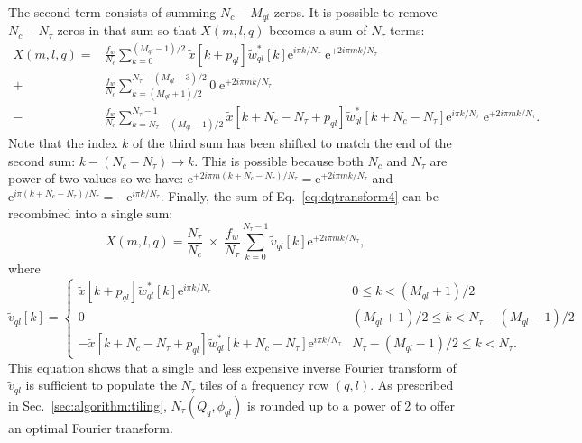 The second term consists of summing $N_c-M_{ql}$ zeros. It is possible to remove $N_c-N_\tau$ zeros in that sum so that $X(m,l,q)$ becomes a sum of $N_\tau$ terms:
\begin{align}
  X(m, l, q)
  = & \frac{f_w}{N_c} \sum_{k=0}^{(M_{ql}-1)/2}{\tilde{x}[k+p_{ql}]\tilde{w}_{ql}^*[k]\mathrm{e}^{i\pi k/N_\tau} \; \mathrm{e}^{+2i\pi mk/N_\tau}} \\
  + & \frac{f_w}{N_c} \sum_{k=(M_{ql}+1)/2}^{N_\tau-(M_{ql}-3)/2}{0 \; \mathrm{e}^{+2i\pi mk/N_\tau}} \\
  - & \frac{f_w}{N_c} \sum_{k=N_\tau-(M_{ql}-1)/2}^{N_\tau-1}{\tilde{x}[k+N_c-N_\tau+p_{ql}]\tilde{w}_{ql}^*[k+N_c-N_\tau]\mathrm{e}^{i\pi k/N_\tau} \; \mathrm{e}^{+2i\pi mk/N_\tau}} .
  \label{eq:dqtransform4}
\end{align}
Note that the index $k$ of the third sum has been shifted to match the end of the second sum: $k-(N_c-N_\tau) \rightarrow k$. This is possible because both $N_c$ and $N_\tau$ are power-of-two values so we have: $\mathrm{e}^{+2i\pi m(k+N_c-N_\tau)/N_\tau} = \mathrm{e}^{+2i\pi mk/N_\tau}$ and $\mathrm{e}^{i\pi (k+N_c-N_\tau)/N_\tau}=-\mathrm{e}^{i\pi k/N_\tau}$. Finally, the sum of Eq.~\ref{eq:dqtransform4} can be recombined into a single sum:
\begin{equation}
  X(m, l, q) = \frac{N_\tau}{N_c} \; \times \; \frac{f_w}{N_\tau} \sum_{k=0}^{N_\tau-1}{\tilde{v}_{ql}[k]\mathrm{e}^{+2i\pi mk/N_\tau}},
  \label{eq:dqtransform5}
\end{equation}
where
\begin{equation}
  \tilde{v}_{ql}[k] =
  \begin{cases}
    \tilde{x}[k+p_{ql}]\tilde{w}_{ql}^*[k]\mathrm{e}^{i\pi k/N_\tau}                     & 0 \le k < (M_{ql}+1)/2 \\
    0                                                                              & (M_{ql}+1)/2 \le k < N_\tau-(M_{ql}-1)/2 \\
    -\tilde{x}[k+N_c-N_\tau+p_{ql}]\tilde{w}_{ql}^*[k+N_c-N_\tau]\mathrm{e}^{i\pi k/N_\tau} & N_\tau-(M_{ql}-1)/2 \le k < N_\tau.
  \end{cases}
  \label{eq:v1}
\end{equation}
This equation shows that a single and less expensive inverse Fourier transform of $\tilde{v}_{ql}$ is sufficient to populate the $N_\tau$ tiles of a frequency row $(q,l)$. As prescribed in Sec.~\ref{sec:algorithm:tiling}, $N_\tau(Q_q, \phi_{ql})$ is rounded up to a power of 2 to offer an optimal Fourier transform.

